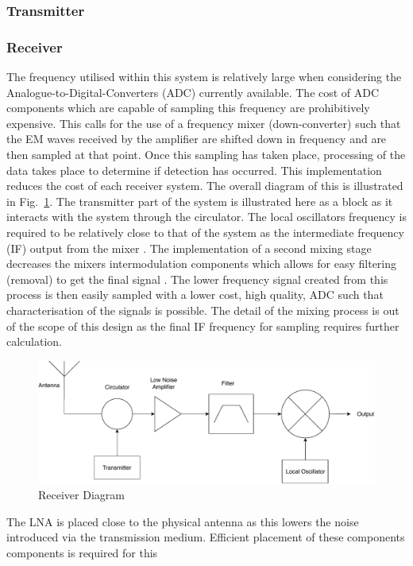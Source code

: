 \documentclass[11pt]{witseiepaper}
\begin{document}
\subsubsection{Transmitter} \label{sec:Transmitter}

\subsubsection{Receiver} \label{sec:Receiver}
The frequency utilised within this system is relatively large when considering the Analogue-to-Digital-Converters (ADC) currently available. The cost of ADC components which are capable of sampling this frequency are prohibitively expensive.
This calls for the use of a frequency mixer (down-converter) such that the EM waves received by the amplifier are shifted down in frequency and are then sampled at that point. Once this sampling has taken place, processing of the data takes place to determine if detection has occurred.
This implementation reduces the cost of each receiver system. The overall diagram of this is illustrated in Fig.~\ref{fig:ReceiverDiagram}. The transmitter part of the system is illustrated here as a block as it interacts with the system through the circulator. The local oscillators frequency is required to be relatively close to that of the system as the intermediate frequency (IF) output from the mixer \cite[p.~397-398]{radarHandbook}. 
The implementation of a second mixing stage decreases the mixers intermodulation components which allows for easy filtering (removal) to get the final signal \cite[p.~398]{radarHandbook}.
The lower frequency signal created from this process is then easily sampled with a lower cost, high quality, ADC such that characterisation of the signals is possible. The detail of the mixing process is out of the scope of this design as the final IF frequency for sampling requires further calculation.

\begin{center}
    \begin{figure}
        \includegraphics[width=\textwidth]{ReceiverDiagram.pdf}
        \caption{Receiver Diagram}
        \label{fig:ReceiverDiagram}    
    \end{figure}
\end{center}
The LNA is placed close to the physical antenna as this lowers the noise introduced via the transmission medium. Efficient placement of these components components is required for this 
\end{document}
